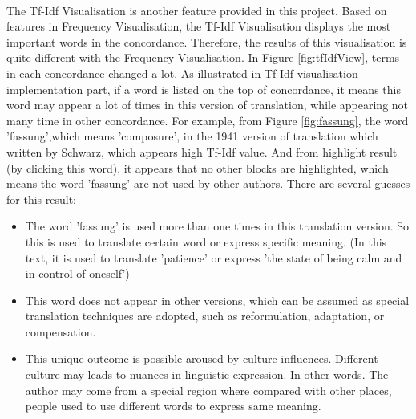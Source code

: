 \paragraph[]{}The Tf-Idf Visualisation is another feature provided in this project. Based on features in Frequency Visualisation, the Tf-Idf Visualisation displays the most important words in the concordance. Therefore, the results of this visualisation is quite different with the Frequency Visualisation. In Figure \ref{fig:tfIdfView}, terms in each concordance changed a lot. As illustrated in Tf-Idf visualisation implementation part, if a word is listed on the top of concordance, it means this word may appear a lot of times in this version of translation, while appearing not many time in other concordance. For example, from Figure \ref{fig:fassung}, the word 'fassung',which means 'composure', in the 1941 version of translation which written by Schwarz, which appears high Tf-Idf value. And from highlight result (by clicking this word), it appears that no other blocks are highlighted, which means the word 'fassung' are not used by other authors. There are several guesses for this result:
\begin{itemize} 	
	\item \textbf{} The word 'fassung' is used more than one times in this translation version. So this is used to translate certain word or express specific meaning. (In this text, it is used to translate 'patience' or express 'the state of being calm and in control of oneself')
	\item \textbf{} This word does not appear in other versions, which can be assumed as special translation techniques are adopted, such as reformulation, adaptation, or compensation. 
	\item \textbf{} This unique outcome is possible aroused by culture influences. Different culture may leads to nuances in linguistic expression. In other words. The author may come from a special region where compared with other places, people used to use different words to express same meaning.
\end{itemize} 

